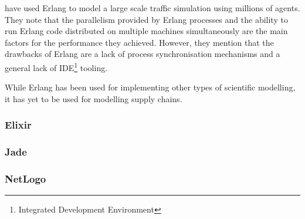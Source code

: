  have used Erlang to model a large scale traffic simulation using millions of agents.
They note that the parallelism provided by Erlang processes and the ability to run Erlang code distributed on multiple machines simultaneously are the main factors for the performance they achieved.
However, they mention that the drawbacks of Erlang are a lack of process synchronisation mechanisms and a general lack of IDE\footnote{Integrated Development Environment} tooling.

While Erlang has been used for implementing other types of scientific modelling, it has yet to be used for modelling supply chains.

\subsubsection{Elixir}

\subsubsection{Jade}

\subsubsection{NetLogo}
